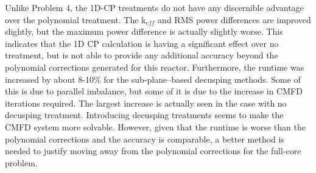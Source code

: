\begin{table}
\centering
\caption{VERA Problem 5 Decusping Results}\label{t:p5decusp}
\end{table}

Unlike Problem 4, the 1D-CP treatments do not have any discernible advantage over the polynomial treatment.  The k$_{eff}$ and RMS power differences are improved slightly, but the maximum power difference is actually slightly worse.  This indicates that the 1D CP calculation is having a significant effect over no treatment, but is not able to provide any additional accuracy beyond the polynomial corrections generated for this reactor.  Furthermore, the runtime was increased by about 8-10\% for the sub-plane--based decusping methods.  Some of this is due to parallel imbalance, but some of it is due to the increase in CMFD iterations required.  The largest increase is actually seen in the case with no decusping treatment.  Introducing decusping treatments seems to make the CMFD system more solvable.  However, given that the runtime is worse than the polynomial corrections and the accuracy is comparable, a better method is needed to justify moving away from the polynomial corrections for the full-core problem.